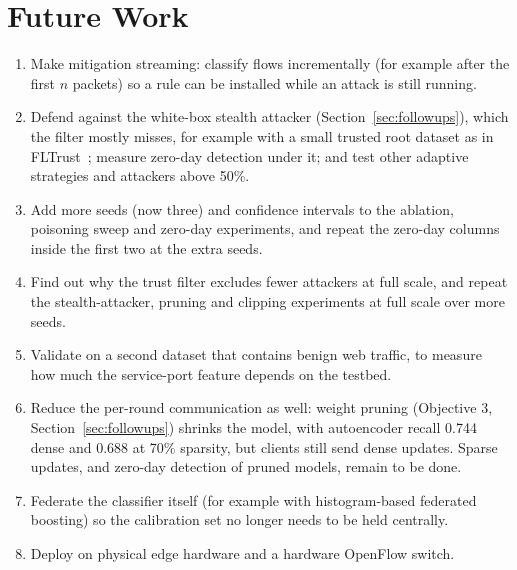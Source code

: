 \section*{Future Work}
\begin{enumerate}
  \item Make mitigation streaming: classify flows incrementally (for example after the first $n$ packets) so a rule can be installed while an attack is still running.
  \item Defend against the white-box stealth attacker (Section~\ref{sec:followups}), which the filter mostly misses, for example with a small trusted root dataset as in FLTrust~\cite{cao2021fltrust}; measure zero-day detection under it; and test other adaptive strategies and attackers above 50\%.
  \item Add more seeds (now three) and confidence intervals to the ablation, poisoning sweep and zero-day experiments, and repeat the zero-day columns inside the first two at the extra seeds.
  \item Find out why the trust filter excludes fewer attackers at full scale, and repeat the stealth-attacker, pruning and clipping experiments at full scale over more seeds.
  \item Validate on a second dataset that contains benign web traffic, to measure how much the service-port feature depends on the testbed.
  \item Reduce the per-round communication as well: weight pruning (Objective 3, Section~\ref{sec:followups}) shrinks the model, with autoencoder recall 0.744 dense and 0.688 at 70\% sparsity, but clients still send dense updates. Sparse updates, and zero-day detection of pruned models, remain to be done.
  \item Federate the classifier itself (for example with histogram-based federated boosting) so the calibration set no longer needs to be held centrally.
  \item Deploy on physical edge hardware and a hardware OpenFlow switch.
\end{enumerate}
